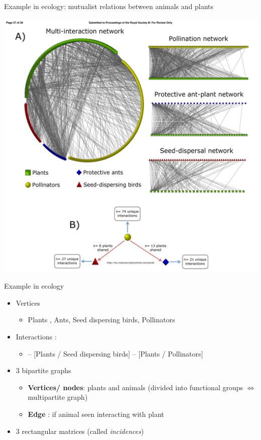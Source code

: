 \documentclass[compress,10pt]{beamer}
\begin{document}
\begin{frame}{Example in ecology: mutualist relations between animals and plants}

\cite{Dattilo}
 
 \includegraphics [width = \linewidth]{plots/network_dattilo.pdf}
 
\end{frame}





\begin{frame}{Example in ecology}
\begin{itemize}
 \item Vertices
 \begin{itemize}
 \item Plants ,  Ants,  Seed dispersing birds, Pollinators 
\end{itemize}
\item Interactions : 
\begin{itemize}
 \item[]  [Plants / ants]  --  [Plants / Seed dispersing birds] --  [Plants / Pollinators] 
\end{itemize}
\item 3 bipartite graphs 
\begin{itemize}
\item \textbf{Vertices/ nodes}: plants and animals (divided into functional groups \textcolor{dgreen}{ $\Leftrightarrow$ multipartite graph}) 
\item \textbf{Edge} : if animal seen interacting with plant
\end{itemize}
\item[\textcolor{dgreen}{$\Leftrightarrow$}] 3 rectangular matrices (called \emph{incidences}) 

\end{itemize}
\end{frame}
\end{document}
